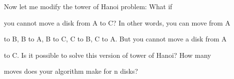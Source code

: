 Now let me modify the tower of Hanoi problem: What if

you cannot move a disk from A to C? In other words, you can move from A

to B, B to A, B to C, C to B, C to A. But you cannot move a disk from A

to C. Is it possible to solve this version of tower of Hanoi? How many

moves does your algorithm make for n disks?


